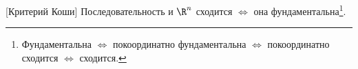 [Критерий Коши]
	 	Последовательность и $\R^n$ сходится $\iff$ она фундаментальна\footnote{Фундаментальна $\iff$ покоординатно фундаментальна $\iff$ покоординатно сходится $\iff$ сходится.}.
	 
